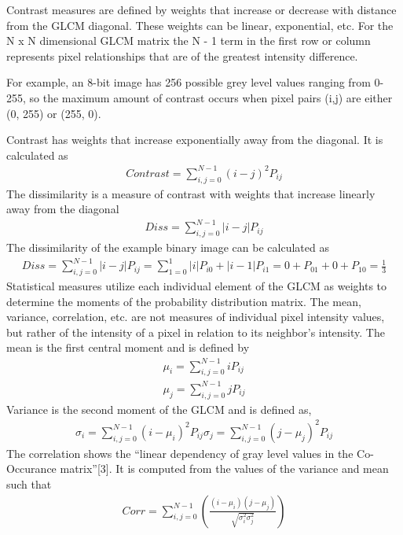 Contrast measures are defined by weights that increase or decrease with distance from the GLCM diagonal.  These weights can be linear, exponential, etc. For the N x N dimensional GLCM matrix the N - 1 term in the first row or column represents pixel relationships that are of the greatest intensity difference.

For example, an 8-bit image has 256 possible grey level values ranging from 0-255, so the maximum amount of contrast occurs when pixel pairs (i,j) are either (0, 255) or (255, 0).

Contrast has weights that increase exponentially away from the diagonal.  It is calculated as
%
\begin{align}
    Contrast = \sum_{i,j=0}^{N-1}(i-j)^2P_{ij}
\end{align}
%
The dissimilarity is a measure of contrast with weights that increase linearly away from the diagonal
%
\begin{align}
    Diss = \sum_{i,j=0}^{N-1}|i-j|P_{ij}
\end{align}
%
The dissimilarity of the example binary image can be calculated as
%
\begin{align}
    Diss = \sum_{i,j=0}^{N-1}|i-j|P_{ij}
    = \sum_{1=0}^{1}|i|P_{i0}+|i-1|P_{i1}
    = 0 + P_{01} + 0 + P_{10} = \frac{1}{3}
\end{align}
%
Statistical measures utilize each individual element of the GLCM as weights to determine the moments of the probability distribution matrix. The mean, variance, correlation, etc. are not measures of individual pixel intensity values, but rather of the intensity of a pixel in relation to its neighbor’s intensity. The mean is the first central moment and is defined by
%
\begin{align}
    \mu_i = \sum_{i,j=0}^{N-1}iP_{ij} \\
    \mu_j = \sum_{i,j=0}^{N-1}jP_{ij}
\end{align}
%
Variance is the second moment of the GLCM and is defined as,
%
\begin{align}
    \sigma_i = \sum_{i,j=0}^{N-1}(i-\mu_i)^2P_{ij}
    \sigma_j = \sum_{i,j=0}^{N-1}(j-\mu_j)^2P_{ij}
\end{align}
%
The correlation shows the “linear dependency of gray level values in the Co-Occurance matrix”[3].  It is computed from the values of the variance and mean such that
%
\begin{align}
    Corr = \sum_{i,j=0}^{N-1}(\frac{(i-\mu_i)(j-\mu_j)}{\sqrt{\sigma_i^2 \sigma_j^2}})
\end{align}
